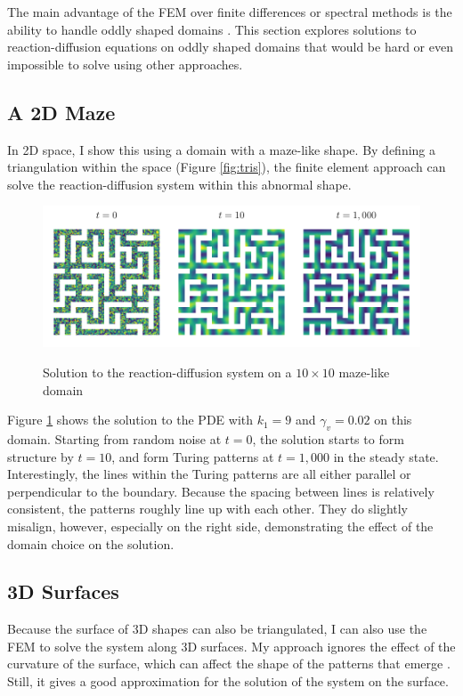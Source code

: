 The main advantage of the FEM over finite differences or spectral methods is the ability to handle oddly shaped domains \parencite{erhunmwun2017review}. This section explores solutions to reaction-diffusion equations on oddly shaped domains that would be hard or even impossible to solve using other approaches.

\subsection{A 2D Maze}

In 2D space, I show this using a domain with a maze-like shape. By defining a triangulation within the space (Figure \ref{fig:tris}), the finite element approach can solve the reaction-diffusion system within this abnormal shape.

\begin{figure}[t]
    \centering
    \caption{Solution to the reaction-diffusion system on a $10 \times 10$ maze-like domain}
    \includegraphics{figures/maze_ts.pdf}
    \label{fig:maze}
\end{figure}

Figure \ref{fig:maze} shows the solution to the PDE with $k_1 = 9$ and $\gamma_v = 0.02$ on this domain. Starting from random noise at $t = 0$, the solution starts to form structure by $t = 10$, and form Turing patterns at $t = 1,000$ in the steady state. Interestingly, the lines within the Turing patterns are all either parallel or perpendicular to the boundary. Because the spacing between lines is relatively consistent, the patterns roughly line up with each other. They do slightly misalign, however, especially on the right side, demonstrating the effect of the domain choice on the solution.


\subsection{3D Surfaces}

Because the surface of 3D shapes can also be triangulated, I can also use the FEM to solve the system along 3D surfaces. My approach ignores the effect of the curvature of the surface, which can affect the shape of the patterns that emerge \parencites{staddon2024zebra}{leon2021full}. Still, it gives a good approximation for the solution of the system on the surface.

